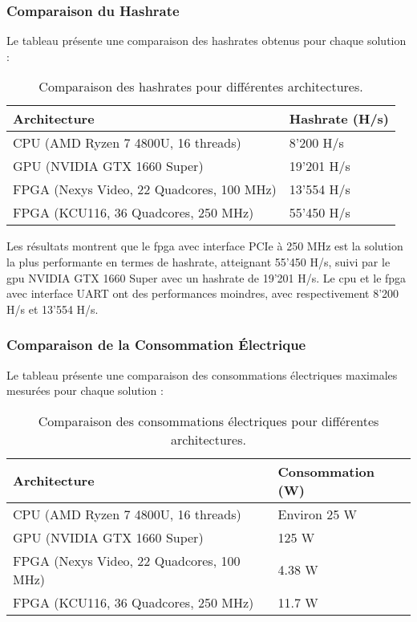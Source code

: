 \subsubsection{Comparaison du Hashrate}

Le tableau présente une comparaison des hashrates obtenus pour chaque solution :

\begin{table}[tbph!]
    \centering
    \begin{tabular}{|l|l|}
    \hline
        \textbf{Architecture} & \textbf{Hashrate (H/s)} \\ \hline
        CPU (AMD Ryzen 7 4800U, 16 threads) & 8'200 H/s \\ \hline
        GPU (NVIDIA GTX 1660 Super) & 19'201 H/s \\ \hline
        FPGA (Nexys Video, 22 Quadcores, 100 MHz) & 13'554 H/s \\ \hline
        FPGA (KCU116, 36 Quadcores, 250 MHz) & 55'450 H/s \\ \hline
    \end{tabular}
    \caption{Comparaison des hashrates pour différentes architectures.}
    \label{tab:hashrate_comparison}
\end{table}

Les résultats montrent que le \gls{fpga} avec interface PCIe à 250 MHz est la solution la plus performante en termes de hashrate, atteignant 55'450 H/s, suivi par le \gls{gpu} NVIDIA GTX 1660 Super avec un hashrate de 19'201 H/s. 
Le \gls{cpu} et le \gls{fpga} avec interface UART ont des performances moindres, avec respectivement 8'200 H/s et 13'554 H/s.

\subsubsection{Comparaison de la Consommation Électrique}

Le tableau présente une comparaison des consommations électriques maximales mesurées pour chaque solution :

\begin{table}[tbph!]
    \centering
    \begin{tabular}{|l|l|}
    \hline
        \textbf{Architecture} & \textbf{Consommation (W)} \\ \hline
        CPU (AMD Ryzen 7 4800U, 16 threads) & Environ 25 W \\ \hline
        GPU (NVIDIA GTX 1660 Super) & 125 W \\ \hline
        FPGA (Nexys Video, 22 Quadcores, 100 MHz) & 4.38 W \\ \hline
        FPGA (KCU116, 36 Quadcores, 250 MHz) & 11.7 W \\ \hline
    \end{tabular}
    \caption{Comparaison des consommations électriques pour différentes architectures.}
    \label{tab:power_comparison}
\end{table}

